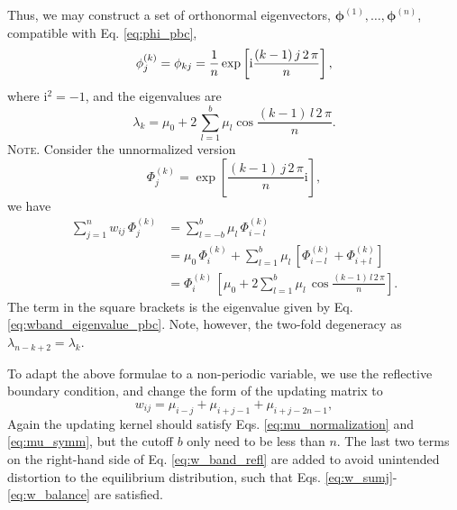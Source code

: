\documentclass[reprint, floatfix]{revtex4-1}
\newcommand{\note}[1]{{\color{DarkGreen}\footnotesize \textsc{Note.} #1}}
\newcommand{\ii}{\mathrm{i}}
\begin{document}
Thus,
we may construct a set of orthonormal eigenvectors,
$\pmb\phi^{(1)}, \dots, \pmb\phi^{(n)}$,
compatible with Eq. \eqref{eq:phi_pbc},
\begin{equation}
  \phi^{(k)}_j
  =
  \phi_{kj}
  =
  \frac 1 n
  \exp
  \left[
    \ii
    \frac{ (k - 1) \, j \, 2 \, \pi }
         {            n             }
  \right]
  ,
  \notag
\end{equation}
%
where $\ii^2 = -1$, and
the eigenvalues are
%
\begin{equation}
  \lambda_k
  =
  \mu_0
  +
  2 \,
  \sum_{ l = 1 }^b
  \mu_l
  \cos
  \frac{ (k - 1) \, l \, 2 \, \pi }
       {            n             }
  .
  \label{eq:wband_eigenvalue_pbc}
\end{equation}
%
\note{Consider the unnormalized version
  $$
  \Phi^{(k)}_j =
  \exp\left[
    \frac{ ( k - 1 ) \, j \, 2 \, \pi }
         {              n             }
    \ii
  \right]
  ,
  $$
  we have
  $$
  \begin{aligned}
  \sum_{j = 1}^n
    w_{ij} \, \Phi^{(k)}_j
  &=
  \sum_{l = -b}^b
    \mu_l \, \Phi^{(k)}_{i - l}
  \\
  &=
  \mu_0 \, \Phi^{(k)}_i
  +
  \sum_{l = 1}^b
    \mu_l \,
    \left[ \Phi^{(k)}_{i - l} + \Phi^{(k)}_{i + l} \right]
  \\
  &=
  \Phi^{(k)}_i \,
  \left[
    \mu_0
    +
    2 \sum_{l = 1}^b
      \mu_l \, \cos
      \frac{ (k - 1) \, l \, 2 \, \pi }
           {            n             }
  \right]
  .
  \end{aligned}
  $$
  The term in the square brackets is the eigenvalue given by
  Eq. \eqref{eq:wband_eigenvalue_pbc}.
}
%
Note, however, the two-fold degeneracy as
$\lambda_{n - k + 2} = \lambda_k$.



To adapt the above formulae to a non-periodic variable,
we use the reflective boundary condition\cite{bussi2006},
and change the form of the updating matrix to
%
%
\begin{equation}
  w_{ij}
  =
  \mu_{ i - j }
  +
  \mu_{ i + j - 1 }
  +
  \mu_{ i + j - 2 n - 1 },
  \label{eq:w_band_refl}
\end{equation}
%
Again the updating kernel should satisfy
Eqs. \eqref{eq:mu_normalization}
and \eqref{eq:mu_symm},
but
the cutoff $b$ only need to be less than $n$.
%
The last two terms
on the right-hand side of Eq. \eqref{eq:w_band_refl} are added
to avoid unintended distortion\cite{dickson2011, mcgovern2013}
to the equilibrium distribution\cite{bussi2006},
such that Eqs. \eqref{eq:w_sumj}-\eqref{eq:w_balance}
are satisfied.
\end{document}
